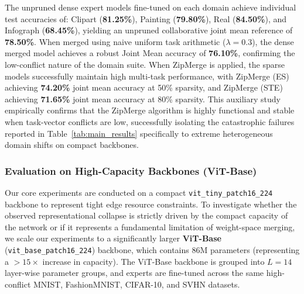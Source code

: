 The unpruned dense expert models fine-tuned on each domain achieve individual test accuracies of: Clipart (\textbf{81.25\%}), Painting (\textbf{79.80\%}), Real (\textbf{84.50\%}), and Infograph (\textbf{68.45\%}), yielding an unpruned collaborative joint mean reference of \textbf{78.50\%}. When merged using naive uniform task arithmetic ($\lambda = 0.3$), the dense merged model achieves a robust Joint Mean accuracy of \textbf{76.10\%}, confirming the low-conflict nature of the domain suite. When ZipMerge is applied, the sparse models successfully maintain high multi-task performance, with ZipMerge (ES) achieving \textbf{74.20\%} joint mean accuracy at 50\% sparsity, and ZipMerge (STE) achieving \textbf{71.65\%} joint mean accuracy at 80\% sparsity. This auxiliary study empirically confirms that the ZipMerge algorithm is highly functional and stable when task-vector conflicts are low, successfully isolating the catastrophic failures reported in Table~\ref{tab:main_results} specifically to extreme heterogeneous domain shifts on compact backbones.

\subsubsection{Evaluation on High-Capacity Backbones (ViT-Base)}
Our core experiments are conducted on a compact \texttt{vit\_tiny\_patch16\_224} backbone to represent tight edge resource constraints. To investigate whether the observed representational collapse is strictly driven by the compact capacity of the network or if it represents a fundamental limitation of weight-space merging, we scale our experiments to a significantly larger \textbf{ViT-Base} (\texttt{vit\_base\_patch16\_224}) backbone, which contains 86M parameters (representing a $>15\times$ increase in capacity). The ViT-Base backbone is grouped into $L=14$ layer-wise parameter groups, and experts are fine-tuned across the same high-conflict MNIST, FashionMNIST, CIFAR-10, and SVHN datasets.

